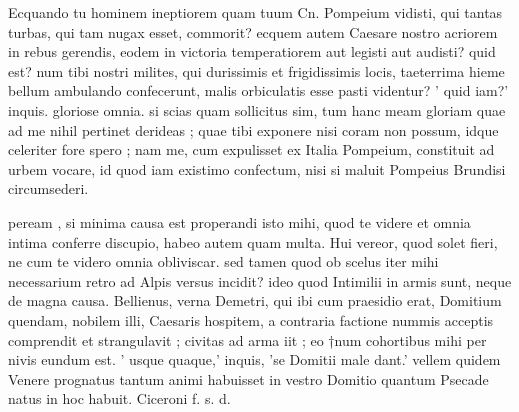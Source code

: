 


 Ecquando tu hominem ineptiorem quam tuum Cn. Pompeium vidisti, qui tantas turbas, qui tam nugax esset, commorit? ecquem autem Caesare nostro acriorem in rebus gerendis, eodem in victoria temperatiorem aut legisti aut audisti? quid est? num tibi nostri milites, qui durissimis et frigidissimis locis, taeterrima hieme bellum ambulando confecerunt, malis orbiculatis esse pasti videntur? ' quid iam?' inquis. gloriose omnia. si scias quam sollicitus sim, tum hanc meam gloriam quae ad me nihil pertinet derideas ; quae tibi exponere nisi coram non possum, idque celeriter fore spero ; nam me, cum expulisset ex Italia Pompeium, constituit ad urbem vocare, id quod iam existimo confectum, nisi si maluit Pompeius Brundisi circumsederi.

 peream , si minima causa est properandi isto mihi, quod te videre et omnia intima conferre discupio, habeo autem quam multa. Hui vereor, quod solet fieri, ne cum te videro omnia obliviscar. sed tamen quod ob scelus iter mihi necessarium retro ad Alpis versus incidit? ideo quod Intimilii in armis sunt, neque de magna causa. Bellienus, verna Demetri, qui ibi cum praesidio erat, Domitium quendam, nobilem illi, Caesaris hospitem, a contraria factione nummis acceptis comprendit et strangulavit ; civitas ad arma iit ; eo †num cohortibus mihi per nivis eundum est. ' usque quaque,' inquis, 'se Domitii male dant.' vellem quidem Venere prognatus tantum animi habuisset in vestro Domitio quantum Psecade natus in hoc habuit. Ciceroni f. s. d.
